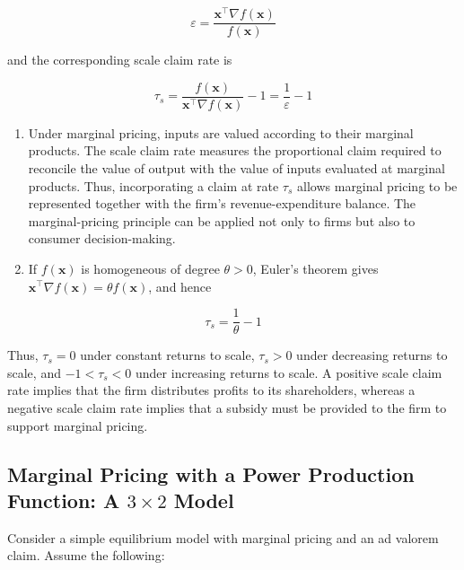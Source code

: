 \documentclass[
  letterpaper,
  DIV=11,
  numbers=noendperiod]{scrreprt}
\begin{document}
\[
\varepsilon
=
\frac{\mathbf x^\top \nabla f(\mathbf x)}{f(\mathbf x)}
\]

and the corresponding scale claim rate is

\[
\tau_s
=
\frac{f(\mathbf x)}{\mathbf x^\top \nabla f(\mathbf x)}-1
=
\frac{1}{\varepsilon}-1
\]

\begin{enumerate}
\def\labelenumi{\arabic{enumi}.}
\setcounter{enumi}{1}
\item
  Under marginal pricing, inputs are valued according to their marginal
  products. The scale claim rate measures the proportional claim
  required to reconcile the value of output with the value of inputs
  evaluated at marginal products. Thus, incorporating a claim at rate
  \(\tau_s\) allows marginal pricing to be represented together with the
  firm's revenue-expenditure balance. The marginal-pricing principle can
  be applied not only to firms but also to consumer decision-making.
\item
  If \(f(\mathbf x)\) is homogeneous of degree \(\theta>0\), Euler's
  theorem gives
  \(\mathbf x^\top \nabla f(\mathbf x)=\theta f(\mathbf x)\), and hence
\end{enumerate}

\[
\tau_s=\frac{1}{\theta}-1
\]

Thus, \(\tau_s=0\) under constant returns to scale, \(\tau_s>0\) under
decreasing returns to scale, and \(-1<\tau_s<0\) under increasing
returns to scale. A positive scale claim rate implies that the firm
distributes profits to its shareholders, whereas a negative scale claim
rate implies that a subsidy must be provided to the firm to support
marginal pricing.

\subsection{\texorpdfstring{Marginal Pricing with a Power Production
Function: A \(3\times2\)
Model}{Marginal Pricing with a Power Production Function: A 3\textbackslash times2 Model}}\label{marginal-pricing-with-a-power-production-function-a-3times2-model}

Consider a simple equilibrium model with marginal pricing and an ad
valorem claim. Assume the following:
\end{document}

